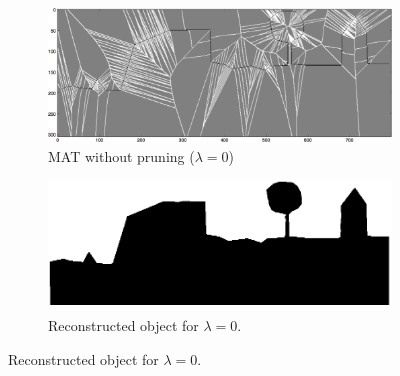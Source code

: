 \begin{figure}
	\centering
	\begin{subfigure}{0.4\linewidth}
	\includegraphics[width=\linewidth]{figs/rasterimpl/simple_dtm-gamma1_earthskel_.png}
	\caption{MAT without pruning ($\lambda=0$)}
	\label{fig:imaimp:a}
	\end{subfigure}
	\quad
	\begin{subfigure}{0.4\linewidth}
	\includegraphics[width=\linewidth]{figs/rasterimpl/simple_dtm-gamma1_earthskel.png}
	\caption{Reconstructed object for $\lambda=0$.}
	\label{fig:imaimp:b}
	\end{subfigure}
	

\end{figure}
